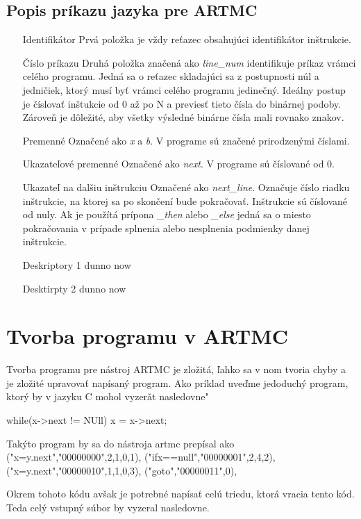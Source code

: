 \subsection{Popis príkazu jazyka pre ARTMC}
\begin{itemize}
    \item[Identifikátor] Prvá položka je vždy reťazec obsahujúci identifikátor inštrukcie.
    \item[Číslo príkazu] Druhá položka značená ako \textit{line\_num} identifikuje príkaz
        vrámci celého programu. Jedná sa o reťazec skladajúci sa z postupnosti
        núl a jedničiek, ktorý musí byť vrámci celého  programu jedinečný.
        Ideálny postup je číslovať inštukcie od 0 až po N a previesť tieto
        čísla do binárnej podoby. Zároveň je dôležité, aby všetky výsledné binárne čísla mali rovnako znakov.
    \item[Premenné] Označené ako \textit{x} a \textit{b}. V programe sú značené prirodzenými číslami.
    \item[Ukazateľové premenné] Označené ako \textit{next}. V programe sú číslované od 0.
    \item[Ukazateľ na dalšiu inštrukciu] Označené ako \textit{next\_line}. Označuje
        číslo riadku inštrukcie, na ktorej sa po skončení bude pokračovať. Inštrukcie
        sú číslované od nuly. Ak je použítá prípona \textit{\_then} alebo \textit{\_else}
        jedná sa o miesto pokračovania v prípade splnenia alebo nesplnenia podmienky danej inštrukcie.
    \item[Deskriptory 1] dunno now
    \item[Desktirpty 2] dunno now
\end{itemize}
\section{Tvorba programu v ARTMC}
Tvorba programu pre nástroj ARTMC je zložitá, ľahko sa v nom tvoria chyby a je zložité
upravovať napísaný program.
Ako príklad uveďme jedoduchý program, ktorý by v jazyku C mohol vyzerǎt nasledovne"

while(x->next != NUll)
    x = x->next;

Takýto program by sa do nástroja artmc prepísal ako
        ("x=y.next","00000000",2,1,0,1),
        ("ifx==null","00000001",2,4,2),
        ("x=y.next","00000010",1,1,0,3),
        ("goto","00000011",0),

Okrem tohoto kódu avšak je potrebné napísať celú triedu, ktorá vracia tento kód.
Teda celý vstupný súbor by vyzeral nasledovne.

